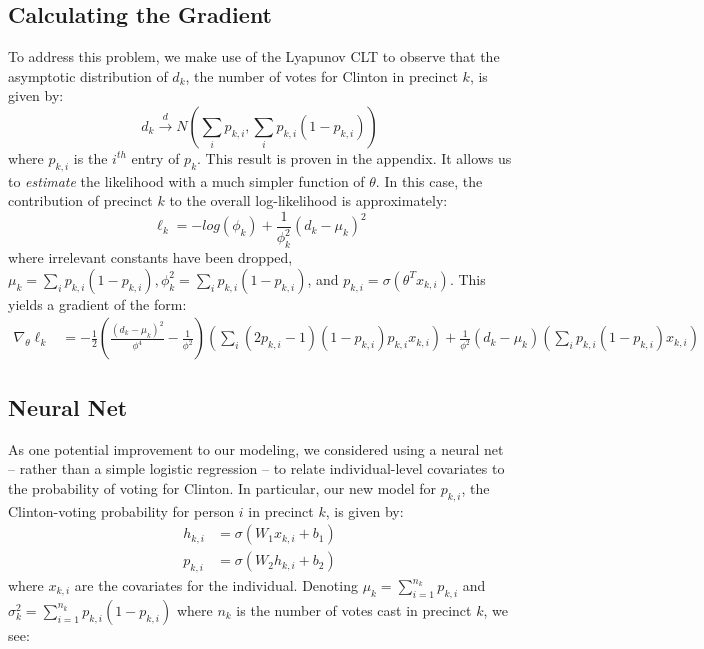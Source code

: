 \documentclass[10pt, letterpaper]{article}
\begin{document}
\subsection{Calculating the Gradient}

To address this problem, we make use of the Lyapunov CLT\cite{LyapunovCondition} to observe that the asymptotic distribution of $d_k$, the number of votes for Clinton in precinct $k$, is given by: 
\[ d_k \stackrel{d} \longrightarrow N \left(\sum_{i} p_{k,i}, \sum_{i} p_{k, i}(1-p_{k, i}) \right) \] 
where $p_{k, i}$ is the $i^{th}$ entry of $p_k$. This result is proven in the appendix. It allows us to \emph{estimate} the likelihood with a much simpler function of $\theta$. In this case, the contribution of precinct $k$ to the overall log-likelihood is approximately: 
\[ \ell_k = -log \left( \phi_k\right) + \frac{1}{\phi_k^2} \left( d_k -\mu_k \right)^2  \] 
where irrelevant constants have been dropped, $\mu_k =  \sum_{i} p_{k, i}(1-p_{k, i}), \phi_k^2 = \sum_{i} p_{k, i}(1-p_{k, i})$, and $p_{k, i} = \sigma(\theta^T x_{k, i})$. This yields a gradient of the form: 
\begin{align*}
\nabla_{\theta} \ell_k &=  -\frac{1}{2} \left(\frac{(d_k - \mu_k)^2}{\phi^4} - \frac{1}{\phi^2} \right) \left( \sum_{i} (2 p_{k, i} - 1)(1-p_{k, i})p_{k, i}x_{k, i} \right) + \frac{1}{\phi^2} (d_k - \mu_k) \left( \sum_i p_{k, i} (1 - p_{k, i}) x_{k, i} \right)
\end{align*}

\subsection{Neural Net} 
As one potential improvement to our modeling, we considered using a neural net -- rather than a simple logistic regression -- to relate individual-level covariates to the probability of voting for Clinton. In particular, our new model for $p_{k, i}$, the Clinton-voting probability for person $i$ in precinct $k$, is given by: 
\begin{align*}
h_{k, i} &= \sigma\left(W_1 x_{k, i} + b_1 \right) \\
p_{k, i} &= \sigma\left(W_2 h_{k, i} + b_2 \right) 
\end{align*}
where $x_{k, i}$ are the covariates for the individual. Denoting $\mu_k = \sum_{i = 1}^{n_k} p_{k, i}$ and $\sigma_k^2 = \sum_{i = 1}^{n_k} p_{k, i} (1 - p_{k, i})$ where $n_k$ is the number of votes cast in precinct $k$, we see: 
\end{document}
